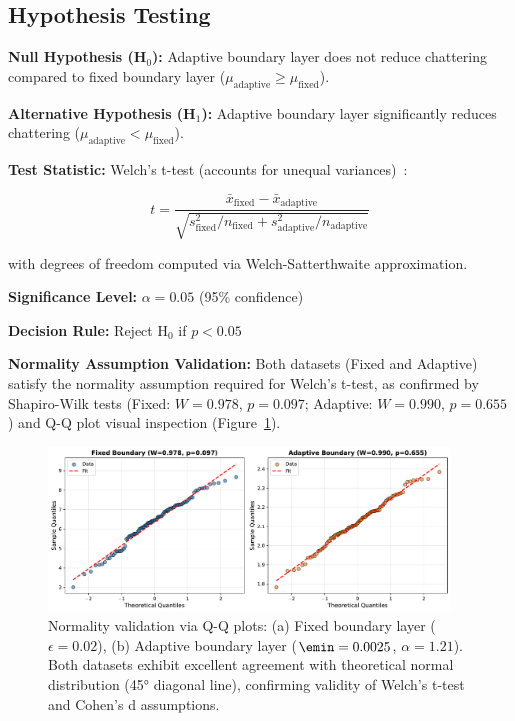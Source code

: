 \subsection{Hypothesis Testing}
\label{subsec:hypothesis_testing}

\textbf{Null Hypothesis (H$_0$):} Adaptive boundary layer does not reduce chattering compared to fixed boundary layer ($\mu_{\text{adaptive}} \geq \mu_{\text{fixed}}$).

\textbf{Alternative Hypothesis (H$_1$):} Adaptive boundary layer significantly reduces chattering ($\mu_{\text{adaptive}} < \mu_{\text{fixed}}$).

\textbf{Test Statistic:} Welch's t-test (accounts for unequal variances)~\cite{welch1947generalization}:

\begin{equation}
\label{eq:welch_t_test}
t = \frac{\bar{x}_{\text{fixed}} - \bar{x}_{\text{adaptive}}}{\sqrt{s_{\text{fixed}}^2/n_{\text{fixed}} + s_{\text{adaptive}}^2/n_{\text{adaptive}}}}
\end{equation}

with degrees of freedom computed via Welch-Satterthwaite approximation.

\textbf{Significance Level:} $\alpha = 0.05$ (95\% confidence)

\textbf{Decision Rule:} Reject H$_0$ if $p < 0.05$

\textbf{Normality Assumption Validation:} Both datasets (Fixed and Adaptive) satisfy the normality assumption required for Welch's t-test, as confirmed by Shapiro-Wilk tests (Fixed: $W=0.978$, $p=0.097$; Adaptive: $W=0.990$, $p=0.655$) and Q-Q plot visual inspection (Figure~\ref{fig:normality_validation}).

\begin{figure}[t]
\centering
\includegraphics[width=0.95\textwidth]{../figures/figure_vi_1_normality_validation.pdf}
\caption{Normality validation via Q-Q plots: (a) Fixed boundary layer ($\epsilon = 0.02$), (b) Adaptive boundary layer ($\emin = 0.0025$, $\alpha = 1.21$). Both datasets exhibit excellent agreement with theoretical normal distribution (45° diagonal line), confirming validity of Welch's t-test and Cohen's d assumptions.}
\label{fig:normality_validation}
\end{figure}

